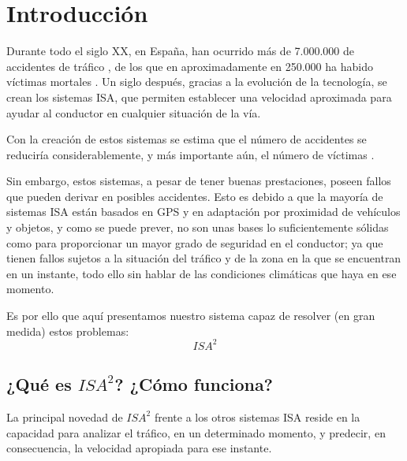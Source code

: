 
\chapter{Introducción} 


Durante todo el siglo XX, en España, han ocurrido más de 7.000.000 de accidentes de tráfico \cite{sigloXX}, de los que en aproximadamente en 250.000 ha habido víctimas mortales \cite{vidas}. Un siglo después, gracias a la evolución de la tecnología, se crean los sistemas \ac{ISA}, que permiten establecer una velocidad aproximada para ayudar al conductor en cualquier situación de la vía.


Con la creación de estos sistemas se estima que el número de accidentes se reduciría considerablemente, y más importante aún, el número de víctimas \cite{reduccion}.


Sin embargo, estos sistemas, a pesar de tener buenas prestaciones, poseen fallos que pueden derivar en posibles accidentes. Esto es debido a que la mayoría de sistemas \ac{ISA} están basados en \ac{GPS} y en adaptación por proximidad de vehículos y objetos, y como se puede prever, no son unas bases lo suficientemente sólidas como para proporcionar un mayor grado de seguridad en el conductor; ya que tienen fallos sujetos a la situación del tráfico y de la zona en la que se encuentran en un instante, todo ello sin hablar de las condiciones climáticas que haya en ese momento.


Es por ello que aquí presentamos nuestro sistema capaz de resolver (en gran medida) estos problemas: \[ISA^{2}\]


\section{¿Qué es $ISA^{2}$? ¿Cómo funciona?}


La principal novedad de $ISA^{2}$ frente a los otros sistemas \ac{ISA} reside en la capacidad para analizar el tráfico, en un determinado momento, y predecir, en consecuencia, la velocidad apropiada para ese instante.


